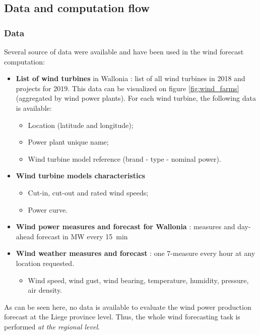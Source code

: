 \documentclass[a4paper, 12pt]{article}
\begin{document}
\subsection{Data and computation flow}

	\subsubsection{Data}

	Several source of data were available and have been used in the wind forecast computation:
	\begin{itemize}
		\item \textbf{List of wind turbines} in Wallonia \parencite{spw-energie}: list of all wind turbines in 2018 and projects for 2019. This data can be visualized on figure \ref{fig:wind_farms} (aggregated by wind power plants). For each wind turbine, the following data is available:
		\begin{itemize}
			\item Location (latitude and longitude);
			\item Power plant unique name;
			\item Wind turbine model reference (brand - type - nominal power).
		\end{itemize}
		\item \textbf{Wind turbine models characteristics} \parencite{wind-turbine-models}
		\begin{itemize}
			\item Cut-in, cut-out and rated wind speeds;
			\item Power curve.
		\end{itemize}
		\item \textbf{Wind power measures and forecast for Wallonia} \parencite{elia-wind}: measures and day-ahead forecast in \si{\mega\watt} every \SI{15}{\minute}
		\item \textbf{Wind weather measures and forecast} \parencite{darksky}: one 7-measure every hour at any location requested.
		\begin{itemize}
			\item Wind speed, wind gust, wind bearing, temperature, humidity, pressure, air density.
		\end{itemize}
	\end{itemize}
	
	As can be seen here, no data is available to evaluate the wind power production forecast at the Liege province level. Thus, the whole wind forecasting task is performed \emph{at the regional level}.
\end{document}
